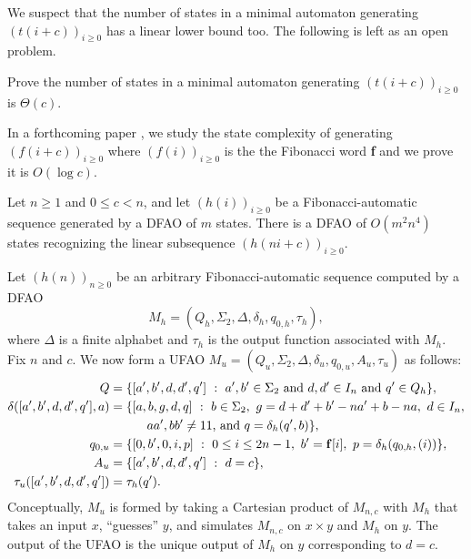 \documentclass[12pt,reqno]{article}
\def\suchthat{\ : \ }
\begin{document}
We suspect that the number of states in a minimal automaton generating $(t(i+c))_{i\geq 0}$ has a linear lower bound too. The following is left as an open problem.

\begin{problem}
    Prove the number of states in a minimal automaton generating $(t(i+c))_{i\geq 0}$ is $\Theta(c)$. 
\end{problem}




In a forthcoming paper \cite{moradi_state_2026}, we study the state complexity of generating $(f(i+c))_{i\geq 0}$ where $(f(i))_{i \geq 0}$ is the the Fibonacci word {\bf f} and we prove it is $O(\log c)$.


\begin{theorem}
Let $n \geq 1$ and $0 \leq c < n$, and let $(h(i))_{i \geq 0}$ be a Fibonacci-automatic sequence generated by a DFAO of $m$ states.  There is a DFAO of
$O(m^2n^4)$ states recognizing the linear subsequence
$(h(ni+c))_{i \geq 0}$.
\label{theorem:lin-subseq-sc}
\end{theorem}

Let $(h(n))_{n \geq 0}$ be an arbitrary Fibonacci-automatic sequence computed by
a DFAO 
$$M_h = (Q_h, \Sigma_2, \Delta, \delta_h, q_{0,h}, \tau_h),$$
where $\Delta$ is a finite alphabet and $\tau_h$ is the output function
associated with $M_h$.  Fix $n$ and $c$. We now form a
UFAO $M_u = (Q_u, \Sigma_2, \Delta, \delta_u, q_{0,u}, A_u, \tau_u )$ as follows:
\begin{align*}
Q &= \{ [a',b',d,d',q'] \suchthat a', b' \in \Sigma_2
\text{ and } d, d' \in I_n \text{ and } q' \in Q_h \}, \\
\delta([a',b',d,d',q'], a) &=
\{ [a,b,g, d,q] \suchthat b \in \Sigma_2,\
 g = d + d' + b'-na' + b-na,\ d \in I_n,\\
 &\quad\quad\quad \text{$aa', bb' \not= 11$, and } q = \delta_h(q', b) \}, \\
 q_{0,u} &= \{ [0,b',0,i,p] \suchthat 0 \leq i \leq 2n-1,\ 
    b '= {\bf f}[i], \ p = \delta_h(q_{0,h}, (i) ) \}, \\
    A_u &= \{ [a',b',d,d',q'] \suchthat d=c \}, \\
\tau_u ([a',b',d, d', q']) &= \tau_h(q').
\end{align*}
Conceptually, $M_u$ is formed by taking a Cartesian product of $M_{n,c}$
with $M_h$ that takes an input $x$, 
``guesses'' $y$, and simulates $M_{n,c}$
on $x \times y$ and $M_h$ on $y$.  The output of the UFAO is the unique output
of $M_h$ on $y$ corresponding to $d = c$.   
\end{document}
